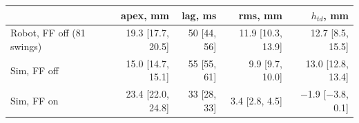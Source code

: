 \begin{tabular}{lrrrr}
\toprule
 & apex, mm & lag, ms & rms, mm & $h_{td}$, mm \\
\midrule
Robot, FF off (81 swings) & 19.3 [17.7, 20.5] & 50 [44, 56] & 11.9 [10.3, 13.9] & 12.7 [8.5, 15.5] \\
Sim, FF off & 15.0 [14.7, 15.1] & 55 [55, 61] & 9.9 [9.7, 10.0] & 13.0 [12.8, 13.4] \\
Sim, FF on & 23.4 [22.0, 24.8] & 33 [28, 33] & 3.4 [2.8, 4.5] & $-$1.9 [$-$3.8, 0.1] \\
\bottomrule
\end{tabular}
